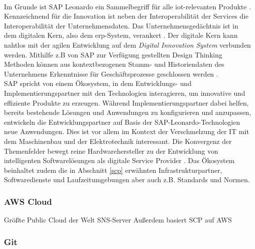 \\Im Grunde ist SAP Leonardo ein Sammelbegriff für alle \ac{iot}-relevanten Produkte \citep{Utecht2018}. Kennzeichnend für die Innovation ist neben der Interoperabilität der Services die Interoperabilität der Unternehmensdaten. Das Unternehmensgedächtnis ist in dem digitalen Kern, also dem \ac{erp}-System, verankert \citep{Elsner2018}. Der digitale Kern kann nahtlos mit der agilen Entwicklung auf dem \textit{Digital Innovation System} verbunden werden. Mithilfe  z.B von SAP zur Verfügung gestellten Design Thinking Methoden können aus kontextbezogenen Stamm- und Historiendaten des Unternehmens Erkenntnisse für Geschäftsprozesse geschlossen werden \citep{Elsner2018}.
\\SAP spricht von einem Ökosystem, in dem Entwicklungs- und Implementierungspartner mit den Technologien interagieren, um innovative und effiziente Produkte zu erzeugen. Während Implementierungspartner dabei helfen, bereits bestehende Lösungen und Anwendungen zu konfigurieren und anzupassen, entwickeln die Entwicklungspartner auf Basis der SAP-Leonardo-Technologien neue Anwendungen. Dies ist vor allem im Kontext der Verschmelzung der IT mit dem Maschinenbau und der Elektrotechnik interessant. Die Konvergenz der Themenfelder bewegt reine Hardwarehersteller zu der Entwicklung von intelligenten Softwarelösungen als digitale Service Provider \citep{Elsner2018}. Das Ökosystem beinhaltet zudem die in Abschnitt \ref{scp} erwähnten Infrastrukturpartner, Softwaredienste und Laufzeitumgebungen aber auch z.B. Standards und Normen.


\subsubsection{AWS Cloud}
Größte Public Cloud der Welt
SNS-Server
Außerdem basiert SCP auf AWS

\subsubsection{Git}

\newpage
